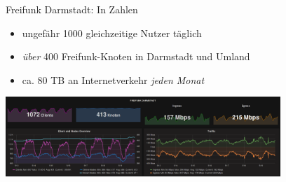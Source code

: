 \documentclass[10pt]{beamer}
\begin{document}
  \begin{frame}{Freifunk Darmstadt: In Zahlen}
    \begin{itemize}
	  \item ungefähr 1000 gleichzeitige Nutzer täglich
	  \item \emph{über} 400 Freifunk-Knoten in Darmstadt und Umland
	  \item ca. 80 TB an Internetverkehr \emph{jeden Monat}
    \end{itemize}
    \begin{center}
      \includegraphics[height=3cm]{images/2016-05_grafana}
    \end{center}
  \end{frame}
\end{document}
